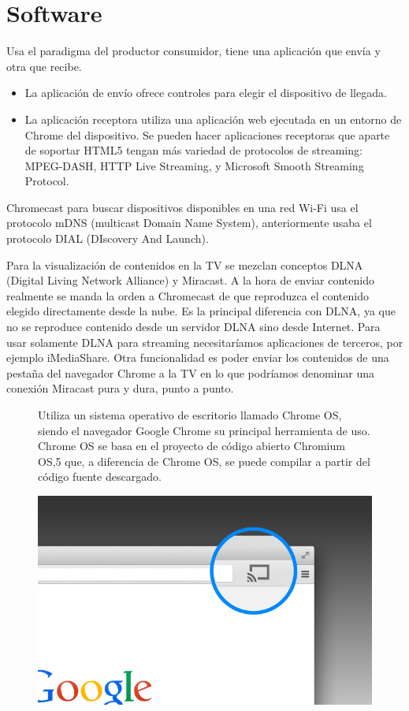 \section{Software}
Usa el paradigma del productor consumidor, tiene una aplicación que envía y otra que recibe.
\begin{itemize}	
	\item La aplicación de envío ofrece controles para elegir el dispositivo de llegada.
	\item La aplicación receptora utiliza una aplicación web ejecutada en un entorno de Chrome del dispositivo. Se pueden hacer aplicaciones receptoras que aparte de soportar HTML5 tengan más variedad de protocolos de streaming: MPEG-DASH, HTTP Live Streaming, y Microsoft Smooth Streaming Protocol.
\end{itemize}

Chromecast para buscar dispositivos disponibles en una red Wi-Fi usa el protocolo mDNS (multicast Domain Name System), anteriormente usaba el protocolo DIAL (DIscovery And Launch).

Para la visualización de contenidos en la TV se mezclan conceptos DLNA (Digital Living Network Alliance) y Miracast\cite{DLNA-Mircast}.
A la hora de enviar contenido realmente se manda la orden a Chromecast de que reproduzca el contenido elegido directamente desde la nube.
Es la principal diferencia con DLNA, ya que no se reproduce contenido desde un servidor DLNA sino desde Internet.
Para usar solamente DLNA para streaming necesitaríamos aplicaciones de terceros, por ejemplo iMediaShare.
Otra funcionalidad es poder enviar los contenidos de una pestaña del navegador Chrome a la TV en lo que podríamos denominar una conexión Miracast pura y dura, punto a punto.




\begin{figure}[ht] 
	\begin{minipage}[b]{0.55\linewidth}
	Utiliza un sistema operativo de escritorio llamado Chrome OS, siendo el navegador Google Chrome su principal herramienta de uso.  
	Chrome OS se basa en el proyecto de código abierto Chromium OS,5 que, a diferencia de Chrome OS, se puede compilar a partir del código fuente descargado.
	\end{minipage}%
	\begin{minipage}[b]{0.45\linewidth}
		\centering
		\includegraphics[width=.65\linewidth]{./Imagenes/googlecastbrowser.jpg} 
	\end{minipage} 
\end{figure}







